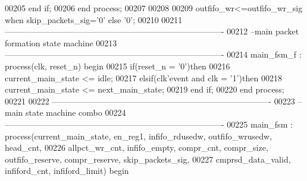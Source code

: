 \begin{DoxyCode}
00205     \textcolor{keywordflow}{end} \textcolor{keywordflow}{if};
00206 \textcolor{keywordflow}{end} \textcolor{keywordflow}{process}; 
00207 
00208 
00209 \textcolor{vhdlchar}{outfifo_wr}\textcolor{vhdlchar}{<=}\textcolor{vhdlchar}{outfifo_wr_sig} \textcolor{keywordflow}{when} \textcolor{vhdlchar}{skip_packets_sig}\textcolor{vhdlchar}{=}\textcolor{vhdlchar}{'}\textcolor{vhdllogic}{}\textcolor{vhdllogic}{0}\textcolor{vhdlchar}{'} \textcolor{keywordflow}{else} \textcolor{vhdlchar}{'}\textcolor{vhdllogic}{}\textcolor{vhdllogic}{0}\textcolor{vhdlchar}{'};
00210   
00211 \textcolor{keyword}{-------------------------------------------------------------------------------}
00212 \textcolor{keyword}{--main packet formation state machine}
00213 \textcolor{keyword}{-------------------------------------------------------------------------------}
00214 main\_fsm\_f : \textcolor{keywordflow}{process}(clk, reset_n) \textcolor{keywordflow}{begin}
00215     \textcolor{keywordflow}{if}\textcolor{vhdlchar}{(}\textcolor{vhdlchar}{reset_n} \textcolor{vhdlchar}{=} \textcolor{vhdlchar}{'}\textcolor{vhdllogic}{}\textcolor{vhdllogic}{0}\textcolor{vhdlchar}{'}\textcolor{vhdlchar}{)}\textcolor{keywordflow}{then}
00216         \textcolor{vhdlchar}{current_main_state} \textcolor{vhdlchar}{<=} \textcolor{vhdlchar}{idle};
00217     \textcolor{keywordflow}{elsif}\textcolor{vhdlchar}{(}\textcolor{vhdlchar}{clk}\textcolor{vhdlchar}{'}\textcolor{vhdlkeyword}{event} \textcolor{keywordflow}{and} \textcolor{vhdlchar}{clk} \textcolor{vhdlchar}{=} \textcolor{vhdlchar}{'}\textcolor{vhdllogic}{}\textcolor{vhdllogic}{1}\textcolor{vhdlchar}{'}\textcolor{vhdlchar}{)}\textcolor{keywordflow}{then} 
00218         \textcolor{vhdlchar}{current_main_state} \textcolor{vhdlchar}{<=} \textcolor{vhdlchar}{next_main_state};
00219     \textcolor{keywordflow}{end} \textcolor{keywordflow}{if}; 
00220 \textcolor{keywordflow}{end} \textcolor{keywordflow}{process};
00221 
00222 \textcolor{keyword}{-------------------------------------------------------------------------------}
00223 \textcolor{keyword}{--main state machine combo}
00224 \textcolor{keyword}{-------------------------------------------------------------------------------}
00225 main\_fsm : \textcolor{keywordflow}{process}(current_main_state, en_reg1, infifo_rdusedw, outfifo_wrusedw, 
      head_cnt, 
00226                             allpct_wr_cnt, infifo_empty, compr_cnt, compr_size, 
      outfifo_reserve, compr_reserve, skip_packets_sig, 
00227                             cmprsd_data_valid, infiford_cnt, infiford_limit) \textcolor{keywordflow}{begin}

\end{DoxyCode}
